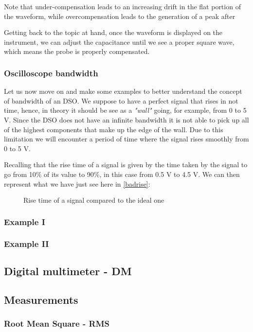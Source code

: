 \documentclass[../main.tex]{subfiles}
\begin{document}
Note that under-compensation leads to an increasing drift in the flat portion of the waveform, while overcompensation leads to the generation of a peak after

Getting back to the topic at hand, once the waveform is displayed on the instrument, we can adjust the capacitance until we see a proper square wave, which means the probe is properly compensated.



\subsubsection{Oscilloscope bandwidth}

Let us now move on and make some examples to better understand the concept of bandwidth of an DSO.
We suppose to have a perfect signal that rises in not time, hence, in theory it should be see as a \textit{"wall"} going, for example, from 0 to 5 V.
Since the DSO does not have an infinite bandwidth it is not able to pick up all of the highest components that make up the edge of the wall. Due to this limitation we will encounter a period of time where the signal rises smoothly from 0 to 5 V.

Recalling that the rise time of a signal is given by the time taken by the signal to go from 10\% of its value to 90\%, in this case from 0.5 V to 4.5 V. We can then represent what we have just see here in \autoref{badrise}:


\begin{figure}
\begin{center}






\caption{Rise time of a signal compared to the ideal one}
\label{badrise}	
\end{center}	
\end{figure}





\subsubsection{Example I}
\subsubsection{Example II}



\subsection{Digital multimeter - DM}

\subsection{Measurements}


\subsubsection{Root Mean Square - RMS}
\end{document}
